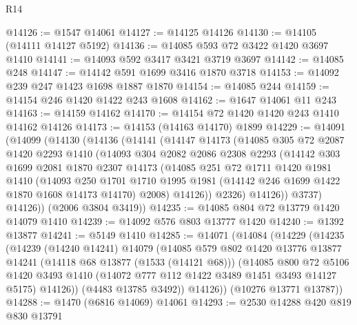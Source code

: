 \begin{lexlean}{R14}
\begin{coremodule}
@14126 := @1547 @14061
@14127 := @14125 @14126
@14130 := @14105 (@14111 @14127 @5192)
@14136 := @14085 @593 @72 @3422 @1420 @3697 @1410
@14141 := @14093 @592 @3417 @3421 @3719 @3697
@14142 := @14085 @248
@14147 := @14142 @591 @1699 @3416 @1870 @3718
@14153 := @14092 @239 @247 @1423 @1698 @1887 @1870
@14154 := @14085 @244
@14159 := @14154 @246 @1420 @1422 @243 @1608
@14162 := @1647 @14061 @11 @243
@14163 := @14159 @14162
@14170 := @14154 @72 @1420 @1420 @243 @1410 @14162 @14126
@14173 := @14153 (@14163 @14170) @1899
@14229 := @14091
    (@14099
      (@14130
        (@14136
          (@14141
            (@14147
              @14173
              (@14085
                @305
                @72
                @2087
                @1420
                @2293
                @1410
                (@14093
                  @304
                  @2082
                  @2086
                  @2308
                  @2293
                  (@14142
                    @303
                    @1699
                    @2081
                    @1870
                    @2307
                    @14173
                    (@14085
                      @251
                      @72
                      @1711
                      @1420
                      @1981
                      @1410
                      (@14093
                        @250
                        @1701
                        @1710
                        @1995
                        @1981
                        (@14142 @246 @1699 @1422 @1870 @1608 @14173 @14170)
                        @2008)
                      @14126))
                  @2326)
                @14126))
            @3737)
          @14126))
      (@2006 @3804 @3419))
@14235 := @14085 @804 @72 @13779 @1420 @14079 @1410
@14239 := @14092 @576 @803 @13777 @1420
@14240 := @1392 @13877
@14241 := @5149 @1410
@14285 := @14071
    (@14084
      (@14229
        (@14235
          (@14239
            (@14240 @14241)
            @14079
            (@14085
              @579
              @802
              @1420
              @13776
              @13877
              @14241
              (@14118 @68 @13877 (@1533 (@14121 @68)))
              (@14085
                @800
                @72
                @5106
                @1420
                @3493
                @1410
                (@14072 @777 @112 @1422 @3489 @1451 @3493 @14127 @5175)
                @14126))
            (@4483 @13785 @3492))
          @14126))
      (@10276 @13771 @13787))
@14288 := @1470 (@6816 @14069) @14061
@14293 := @2530 @14288 @420 @819 @830 @13791

\end{coremodule}
\end{lexlean}
